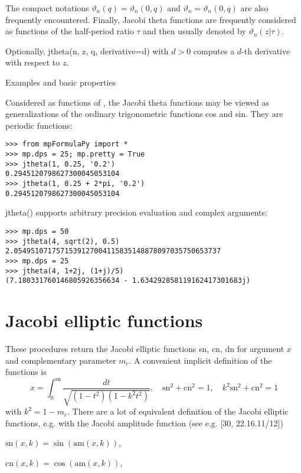 \vpara
The compact notations $\vartheta_n(q) = \vartheta_n(0,q)$ and $\vartheta_n = \vartheta_n(0,q)$ are also frequently encountered. Finally, Jacobi theta functions are frequently considered as functions of the half-period ratio $\tau$ and then usually denoted by $\vartheta_n(z|\tau)$.

\vpara
Optionally, jtheta(n, z, q, derivative=d) with $d>0$ computes a $d$-th derivative with respect to $z$.

Examples and basic properties

Considered as functions of , the Jacobi theta functions may be viewed as
generalizations of the ordinary trigonometric functions cos and sin. They are periodic functions:

\begin{lstlisting}
>>> from mpFormulaPy import *
>>> mp.dps = 25; mp.pretty = True
>>> jtheta(1, 0.25, '0.2')
0.2945120798627300045053104
>>> jtheta(1, 0.25 + 2*pi, '0.2')
0.2945120798627300045053104
\end{lstlisting}

jtheta() supports arbitrary precision evaluation and complex arguments:

\begin{lstlisting}
>>> mp.dps = 50
>>> jtheta(4, sqrt(2), 0.5)
2.0549510717571539127004115835148878097035750653737
>>> mp.dps = 25
>>> jtheta(4, 1+2j, (1+j)/5)
(7.180331760146805926356634 - 1.634292858119162417301683j)
\end{lstlisting}


\newpage
\section{Jacobi elliptic functions}


These procedures return the Jacobi elliptic functions sn, cn, dn for argument $x$ and
complementary parameter $m_c$. A convenient implicit definition of the functions is
\begin{equation}
x = \int_0^{\text{sn}} \frac{dt}{\sqrt{(1-t^2)(1-k^2 t^2)}}, \quad \text{sn}^2 + \text{cn}^2 = 1,  \quad k^2 \text{sn}^2 + \text{cn}^2 = 1
\end{equation}
with $k^2 = 1 - m_c$. There are a lot of equivalent definition of the Jacobi elliptic functions, e.g. with the Jacobi amplitude function (see e.g. \cite{NIST} [30, 22.16.11/12]) 
\begin{center}
	$\text{sn}(x, k) = \sin(\text{am}(x, k))$, 
	
	$\text{cn}(x, k) = \cos(\text{am}(x, k))$, 
\end{center}

